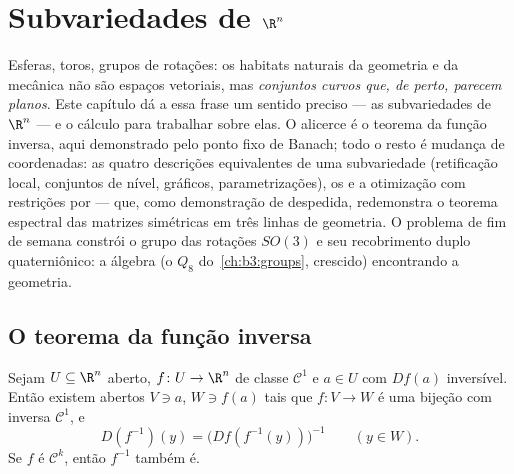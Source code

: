 \chapter{Subvariedades de \texorpdfstring{$\R^n$}{Rn}}
\label{ch:b3:submanifolds}

Esferas, toros, grupos de rotações: os habitats naturais da geometria e
da mecânica não são espaços vetoriais, mas \emph{conjuntos curvos que,
de perto, parecem planos}. Este capítulo dá a essa frase um sentido
preciso --- as subvariedades de $\R^n$ --- e o cálculo para trabalhar
sobre elas. O alicerce é o teorema da função inversa, aqui demonstrado
pelo ponto fixo de Banach; todo o resto é mudança de coordenadas: as
quatro descrições equivalentes de uma subvariedade (retificação local,
conjuntos de nível, gráficos, parametrizações), os  e a
otimização com restrições por  --- que, como
demonstração de despedida, redemonstra o teorema espectral das matrizes
simétricas em três linhas de geometria. O problema de fim de semana
constrói o grupo das rotações $SO(3)$ e seu recobrimento duplo
quaterniônico: a álgebra (o $Q_8$ do~\cref{ch:b3:groups}, crescido)
encontrando a geometria.

\section{O teorema da função inversa}

\begin{theorem}
\label{thm:b3:submanifolds:ift}
Sejam $U \subseteq \R^n$ aberto, $f \colon U \to \R^n$ de classe $\mathcal C^1$ e $a \in U$ com $Df(a)$ inversível.
Então existem abertos $V \ni a$, $W \ni f(a)$ tais que $f \colon V \to W$ é uma bijeção com inversa
$\mathcal C^1$, e
\[
D(f^{-1})(y) = \bigl(Df(f^{-1}(y))\bigr)^{-1}
\qquad (y \in W).
\]
Se $f$ é $\mathcal C^k$, então $f^{-1}$ também é.
\end{theorem}

